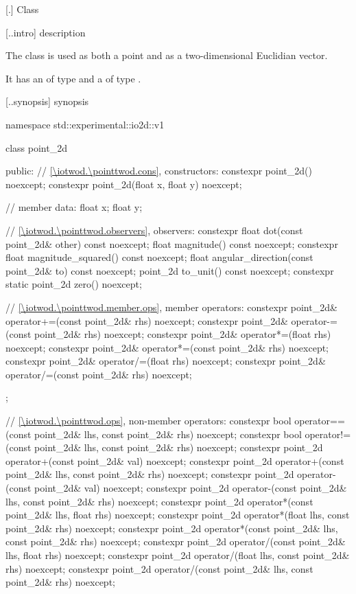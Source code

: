  [\iotwod.\pointtwod] {Class }

 [\iotwod.\pointtwod.intro] { description}

%
\pnum
The class  is used as both a point and as a two-dimensional Euclidian vector.

\pnum
It has an  of type  and a  of type .

 [\iotwod.\pointtwod.synopsis] { synopsis}

\begin{codeblock}
namespace std::experimental::io2d::v1 {
  class point_2d {
  public:
    // \ref{\iotwod.\pointtwod.cons}, constructors:
    constexpr point_2d() noexcept;
    constexpr point_2d(float x, float y) noexcept;

    // member data:
    float x;
    float y;
    
    // \ref{\iotwod.\pointtwod.observers}, observers:
    constexpr float dot(const point_2d& other) const noexcept;
    float magnitude() const noexcept;
    constexpr float magnitude_squared() const noexcept;
    float angular_direction(const point_2d& to) const noexcept;
    point_2d to_unit() const noexcept;
    constexpr static point_2d zero() noexcept;
    
    // \ref{\iotwod.\pointtwod.member.ops}, member operators:
    constexpr point_2d& operator+=(const point_2d& rhs) noexcept;
    constexpr point_2d& operator-=(const point_2d& rhs) noexcept;
    constexpr point_2d& operator*=(float rhs) noexcept;
    constexpr point_2d& operator*=(const point_2d& rhs) noexcept;
    constexpr point_2d& operator/=(float rhs) noexcept;
    constexpr point_2d& operator/=(const point_2d& rhs) noexcept;
  };
  
  // \ref{\iotwod.\pointtwod.ops}, non-member operators:
  constexpr bool operator==(const point_2d& lhs, const point_2d& rhs)
    noexcept;
  constexpr bool operator!=(const point_2d& lhs, const point_2d& rhs)
    noexcept;
  constexpr point_2d operator+(const point_2d& val) noexcept;
  constexpr point_2d operator+(const point_2d& lhs, const point_2d& rhs)
    noexcept;
  constexpr point_2d operator-(const point_2d& val) noexcept;
  constexpr point_2d operator-(const point_2d& lhs, const point_2d& rhs)
    noexcept;
  constexpr point_2d operator*(const point_2d& lhs, float rhs) noexcept;
  constexpr point_2d operator*(float lhs, const point_2d& rhs) noexcept;
  constexpr point_2d operator*(const point_2d& lhs, const point_2d& rhs)
    noexcept;
  constexpr point_2d operator/(const point_2d& lhs, float rhs) noexcept;
  constexpr point_2d operator/(float lhs, const point_2d& rhs) noexcept;
  constexpr point_2d operator/(const point_2d& lhs, const point_2d& rhs)
    noexcept;
}
\end{codeblock}

